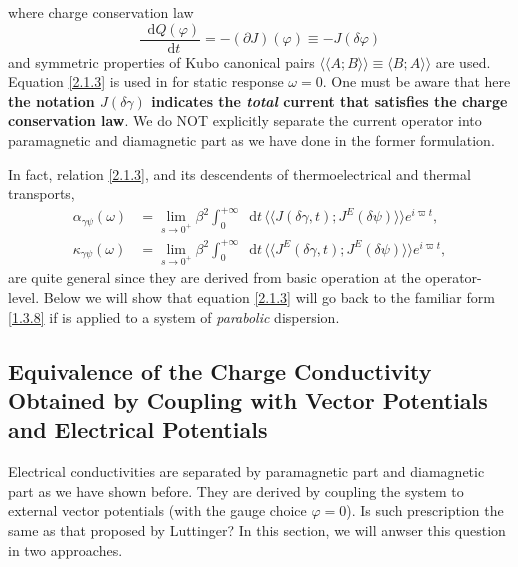 \documentclass[10pt,nofootinbib,letterpaper]{revtex4}
\newcommand*\dd{\mathop{}\!\mathrm{d}}
\newcounter{Note}[section]
\newenvironment{Note}[1][]{{\par\normalfont\bfseries \underline{Note~\stepcounter{Note}\arabic{Note}.}~#1~~}}{\par}
\begin{document}
		where charge conservation law
		\begin{equation}\label{2.1.4}
			\dfrac{\dd Q(\varphi)}{\dd t}=-(\partial J)(\varphi)\equiv-J(\delta\varphi)
		\end{equation}
		and symmetric properties of Kubo canonical pairs $\langle\langle A;B\rangle\rangle\equiv\langle B;A\rangle\rangle$ are used. Equation \eqref{2.1.3} is used in \cite{kapustin2020thermal} for static response $\omega=0$.
		\begin{Note}
			One must be aware that here \textbf{the notation $J(\delta\gamma)$ indicates the \emph{total} current that satisfies the charge conservation law}. We do NOT explicitly separate the current operator into paramagnetic and diamagnetic part as we have done in the former formulation.
		\end{Note}
		\begin{Note}
			In fact, relation \eqref{2.1.3}, and its descendents of thermoelectrical and thermal transports,
			{\color{red}\begin{align}
				\alpha_{\gamma\psi}(\omega)&=\lim_{s \rightarrow0^+}\beta^2\int_0^{+\infty}\dd t\,\langle\langle J(\delta\gamma,t); J^E(\delta\psi)\rangle\rangle e^{i\varpi t},\label{2.1.5}\\
				\kappa_{\gamma\psi}(\omega)&=\lim_{s \rightarrow0^+}\beta^2\int_0^{+\infty}\dd t\,\langle\langle J^E(\delta\gamma,t); J^E(\delta\psi)\rangle\rangle e^{i\varpi t},\label{2.1.6}
			\end{align}}
			are quite general since they are derived from basic operation at the operator-level. Below we will show that equation \eqref{2.1.3} will go back to the familiar form \eqref{1.3.8} if is applied to a system of \emph{parabolic} dispersion.
		\end{Note}

	\subsection{Equivalence of the Charge Conductivity Obtained by Coupling with Vector Potentials\\ and Electrical Potentials}
		Electrical conductivities are separated by paramagnetic part and diamagnetic part as we have shown before. They are derived by coupling the system to external vector potentials (with the gauge choice $\varphi=0$). Is such prescription the same as that proposed by Luttinger? In this section, we will anwser this question in two approaches.\par
\end{document}
